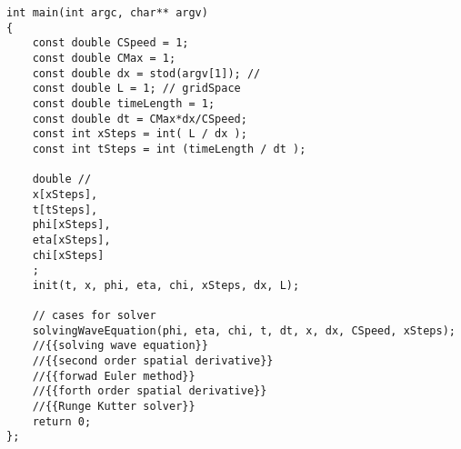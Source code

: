 \documentclass[10pt,fleqn,reqno,a4paper]{article}
\begin{document}
\begin{verbatim}
int main(int argc, char** argv)
{
    const double CSpeed = 1;
    const double CMax = 1;
    const double dx = stod(argv[1]); //
    const double L = 1; // gridSpace
    const double timeLength = 1;
    const double dt = CMax*dx/CSpeed;
    const int xSteps = int( L / dx );
    const int tSteps = int (timeLength / dt );

    double //
    x[xSteps],
    t[tSteps],
    phi[xSteps],
    eta[xSteps],
    chi[xSteps]
    ;
    init(t, x, phi, eta, chi, xSteps, dx, L);

    // cases for solver
    solvingWaveEquation(phi, eta, chi, t, dt, x, dx, CSpeed, xSteps);
    //{{solving wave equation}}
    //{{second order spatial derivative}}
    //{{forwad Euler method}}
    //{{forth order spatial derivative}}
    //{{Runge Kutter solver}}
	return 0;
};
\end{verbatim}
\end{document}
